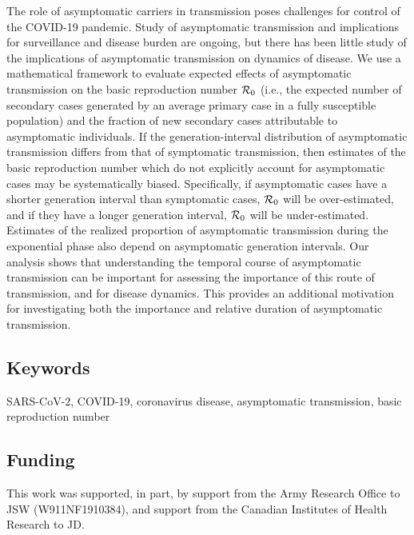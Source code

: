 {\footnotesize 

The role of asymptomatic carriers in transmission poses challenges for control of the COVID-19 pandemic. 
Study of asymptomatic transmission and implications for surveillance and disease burden are ongoing,  
but there has been little study of the implications of asymptomatic transmission on dynamics of disease.
We use a mathematical framework to evaluate expected effects of asymptomatic transmission on the basic reproduction number ${\cal{R}}_0$ (i.e., the expected number of secondary cases generated by an average primary case in a fully susceptible population) and the fraction of new secondary cases attributable to asymptomatic individuals.
If the generation-interval distribution of asymptomatic transmission differs from that of symptomatic transmission, then estimates of the basic reproduction number which do not explicitly account for asymptomatic cases may be systematically biased. 
Specifically, if asymptomatic cases have a shorter generation interval than symptomatic cases, ${\cal{R}}_0$ will be over-estimated, and if they have a longer generation interval, ${\cal{R}}_0$ will be under-estimated.
Estimates of the realized proportion of asymptomatic transmission during the exponential phase also depend on asymptomatic generation intervals.
Our analysis shows that understanding the temporal course of asymptomatic transmission can be important for assessing the importance of this route of transmission, and for disease dynamics. This provides an additional motivation for investigating both the importance and relative duration of asymptomatic transmission. 

\subsection*{Keywords}

SARS-CoV-2, COVID-19, coronavirus disease, asymptomatic transmission, basic reproduction number

\subsection*{Funding}

This work was supported, in part, by support from the Army Research Office to JSW (W911NF1910384), and support from the Canadian Institutes of Health Research to JD.}
